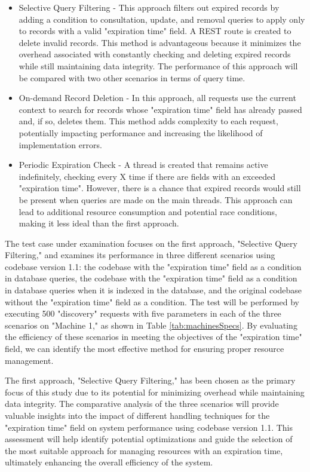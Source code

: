 \documentclass[a4paper,fleqn]{cas-dc}
\begin{document}
\begin{itemize}
	\item Selective Query Filtering - This approach filters out expired records by adding a condition to consultation, update, and removal queries to apply only to records with a valid "expiration time" field. A REST route is created to delete invalid records. This method is advantageous because it minimizes the overhead associated with constantly checking and deleting expired records while still maintaining data integrity. The performance of this approach will be compared with two other scenarios in terms of query time.
	\item On-demand Record Deletion - In this approach, all requests use the current context to search for records whose "expiration time" field has already passed and, if so, deletes them. This method adds complexity to each request, potentially impacting performance and increasing the likelihood of implementation errors.
	\item Periodic Expiration Check - A thread is created that remains active indefinitely, checking every X time if there are fields with an exceeded "expiration time". However, there is a chance that expired records would still be present when queries are made on the main threads. This approach can lead to additional resource consumption and potential race conditions, making it less ideal than the first approach.
\end{itemize}

The test case under examination focuses on the first approach, "Selective Query Filtering," and examines its performance in three different scenarios using codebase version 1.1: the codebase with the "expiration time" field as a condition in database queries, the codebase with the "expiration time" field as a condition in database queries when it is indexed in the database, and the original codebase without the "expiration time" field as a condition. The test will be performed by executing 500 "discovery" requests with five parameters in each of the three scenarios on "Machine 1," as shown in Table \ref{tab:machinesSpecs}. By evaluating the efficiency of these scenarios in meeting the objectives of the "expiration time" field, we can identify the most effective method for ensuring proper resource management.

The first approach, "Selective Query Filtering," has been chosen as the primary focus of this study due to its potential for minimizing overhead while maintaining data integrity. The comparative analysis of the three scenarios will provide valuable insights into the impact of different handling techniques for the "expiration time" field on system performance using codebase version 1.1. This assessment will help identify potential optimizations and guide the selection of the most suitable approach for managing resources with an expiration time, ultimately enhancing the overall efficiency of the system.
\end{document}
